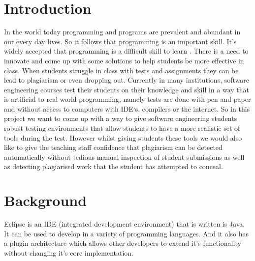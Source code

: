 \documentclass[twocolumn]{article}
\begin{document}


\begin{abstract}

\end{abstract}

\section{Introduction}
In the world today programming and programs are prevalent and abundant in our
every day lives. So it follows that programming is an important skill. It's
widely accepted that programming is a difficult skill to learn
\cite{jenkins2002difficulty, robins2003learning}. There is a need to innovate
and come up with some solutions to help students be more effective in class.
When students struggle in class with tests and assignments they can be lead to
plagiarism or even dropping out\cite{bennedsen2007failure}. Currently in many
institutions, software engineering courses test their students on their
knowledge and skill in a way that is artificial to real world programming,
namely tests are done with pen and paper and without access to computers with
IDE`s, compilers or the internet. So in this project we want to come up with a
way to give software engineering students robust testing environments that allow
students to have a more realistic set of tools during the test. However whilst
giving students these tools we would also like to give the teaching staff
confidence that plagiarism can be detected automatically without tedious manual
inspection of student submissions as well as detecting plagiarised work that the
student has attempted to conceal.

\section{Background}
Eclipse is an IDE (integrated development environment) that is written is Java.
It can be used to develop in a variety of programming languages. And it also has
a plugin architecture which allows other developers to extend it's functionality
without changing it's core implementation.
\end{document}
